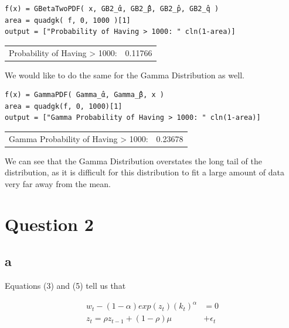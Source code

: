 \documentclass[12pt, letterpaper]{paper}
\begin{document}
\begin{verbatim}
f(x) = GBetaTwoPDF( x, GB2_̂α, GB2_̂β, GB2_̂p, GB2_̂q )
area = quadgk( f, 0, 1000 )[1]
output = ["Probability of Having > 1000: " cln(1-area)]
\end{verbatim}

\begin{center}
\begin{tabular}{lr}
Probability of Having > 1000: & 0.11766\\
\end{tabular}
\end{center}

We would like to do the same for the Gamma Distribution as well. 

\begin{verbatim}
f(x) = GammaPDF( Gamma_̂α, Gamma_̂β, x )
area = quadgk(f, 0, 1000)[1]
output = ["Gamma Probability of Having > 1000: " cln(1-area)]
\end{verbatim}

\begin{center}
\begin{tabular}{lr}
Gamma Probability of Having > 1000: & 0.23678\\
\end{tabular}
\end{center}

We can see that the Gamma Distribution overstates the long tail of the
distribution, as it is difficult for this distribution to fit a large
amount of data very far away from the mean.

\section{Question 2}
\label{sec:orge15ef94}

\subsection{a}
\label{sec:org54fc3fd}

Equations (3) and (5) tell us that


\begin{align*}
  w_t - (1-\alpha) exp( z_t ) (k_t)^{\alpha} &= 0\\
  z_t = \rho z_{t-1} + (1-\rho)\mu &+ \epsilon_t
\end{align*}
\end{document}
